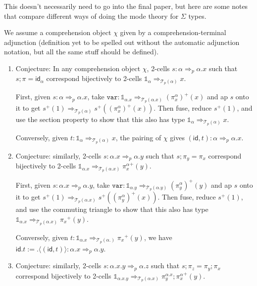 \documentclass[10pt]{article}
\theoremstyle{definition}
\newcommand{\tcell}{\Rightarrow}
\newcommand{\id}{\mathsf{id}}
\newcommand\TrPlus[2]{\ensuremath{{#1}^+(#2)}}
\newcommand\El[2]{\mathcal{T}_{#1}(#2)}
\newcommand\ap[2]{\ensuremath{#1 \langle #2 \rangle }}
\newcommand\One{\ensuremath{\mathds{1}}}
\newcommand\mtt[1]{\mathtt{#1}}
\begin{document}
\iffalse
{}

This doesn't necessarily need to go into the final paper, but here are
some notes that compare different ways of doing the mode theory for
$\Sigma$ types.

We assume a comprehension object $\chi$ given by a
comprehension-terminal adjunction (definition yet to be spelled out
without the automatic adjunction notation, but all the same stuff should
be defined).


\begin{enumerate}

\item \label{sigma:total-to-fiber0} Conjecture: In any comprehension
  object $\chi$, 2-cells $s : \alpha \tcell_p \alpha.x$ such that $s;\pi
  = \id_\alpha$ correspond bijectively to 2-cells $\One_\alpha
  \tcell_{\El{p}{\alpha}} x$.

  First, given $s : \alpha \tcell_p \alpha.x$, take $\mtt{var} : \One_{\alpha.x}
  \tcell_{\El{p}{\alpha.x}} \TrPlus{(\pi^\alpha_x)}{x}$ and ap $s$ onto
  it to get $\TrPlus{s}{1} \tcell_{\El{p}{\alpha}}
  \TrPlus{s}{\TrPlus{(\pi^\alpha_x)}{x}}$.  Then fuse, reduce
  $\TrPlus{s}{1}$, and use the section property to show that this also
  has type
  $\One_\alpha \tcell_{\El{p}{\alpha}} x$.

  Conversely, given $t : \One_\alpha \tcell_{\El{p}{\alpha}} x$,
  the pairing of $\chi$ gives $(\id, t) : \alpha \tcell_p \alpha.x$.

\item \label{sigma:total-to-fiber1} Conjecture: similarly, 2-cells $s :
  \alpha.x \tcell_p \alpha.y$ such that $s;\pi_y = \pi_x$ correspond
  bijectively to 2-cells $\One_{\alpha.x} \tcell_{\El{p}{\alpha.x}}
  \TrPlus{\pi^\alpha_x}{y}$.

  First, given $s : \alpha.x \tcell_p \alpha.y$, take $\mtt{var} :
  \One_{\alpha.y} \tcell_{\El{p}{\alpha.y}} \TrPlus{(\pi^\alpha_y)}{y}$ and
  ap $s$ onto it to get $\TrPlus{s}{1} \tcell_{\El{p}{\alpha.x}}
  \TrPlus{s}{\TrPlus{(\pi^\alpha_y)}{x}}$.  Then fuse, reduce
  $\TrPlus{s}{1}$, and use the commuting triangle to show that this also
  has type $\One_{\alpha.x} \tcell_{\El{p}{\alpha.x}} \TrPlus{\pi_x} y$.

  Conversely, given $t : \One_{\alpha.x} \tcell_{\El{p}{\alpha.}}
  \TrPlus{\pi_x} y$, we have $\id.t := \ap{.}{(\id, t)} : \alpha.x \tcell_p \alpha.y$.

\item \label{sigma:total-to-fiber2} Conjecture: similarly, 2-cells $s :
  \alpha.x.y \tcell_p \alpha.z$ such that $s;\pi_z = \pi_y;\pi_x$
  correspond bijectively to 2-cells $\One_{\alpha.x.y}
  \tcell_{\El{p}{\alpha.x}} \TrPlus{\pi^{\alpha.x}_y;\pi^\alpha_x}{y}$.


\end{enumerate}
\end{document}
